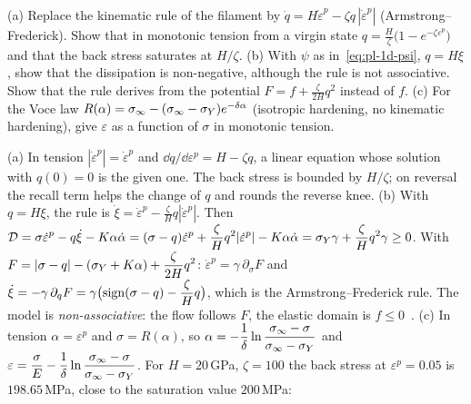 \label{exo:pl-af}
%
(a) Replace the kinematic rule of the filament by
$\dot q=H\dot\varepsilon^p-\zeta q\,|\dot\varepsilon^p|$ (Armstrong--Frederick).
Show that in monotonic tension from a virgin state
$\displaystyle q=\frac H\zeta\bigl(1-e^{-\zeta\varepsilon^p}\bigr)$ and that the back stress
saturates at $H/\zeta$. (b) With $\psi$ as in~\eqref{eq:pl-1d-psi}, $q=H\xi$,
show that the dissipation is non-negative, although the rule is not
associative. Show that the rule derives from the potential
$\displaystyle F=f+\frac{\zeta}{2H}q^2$ instead of $f$. (c) For the Voce law
$R(\alpha)=\sigma_\infty-(\sigma_\infty-\sigma_{Y})e^{-\delta\alpha}$ (isotropic
hardening, no kinematic hardening), give $\varepsilon$ as a function of
$\sigma$ in monotonic tension.
\begin{solution}
(a) In tension $|\dot\varepsilon^p|=\dot\varepsilon^p$ and
$\dd q/\dd\varepsilon^p=H-\zeta q$, a linear equation whose solution with
$q(0)=0$ is the given one. The back stress is bounded by $H/\zeta$; on
reversal the recall term helps the change of $q$ and rounds the reverse knee.
(b) With $q=H\xi$, the rule is $\displaystyle \dot\xi=\dot\varepsilon^p-\frac{\zeta}{H}q|\dot\varepsilon^p|$.
Then $\displaystyle \mathcal D=\sigma\dot\varepsilon^p-q\dot\xi-K\alpha\dot\alpha
=(\sigma-q)\dot\varepsilon^p+\frac\zeta Hq^2|\dot\varepsilon^p|-K\alpha\dot\alpha
=\sigma_{Y}\gamma+\frac\zeta Hq^2\gamma\ge0$. With $\displaystyle F=|\sigma-q|-(\sigma_{Y}+K\alpha)+\frac{\zeta}{2H}q^2$:
$\dot\varepsilon^p=\gamma\,\partial_\sigma F$ and
$\displaystyle \dot\xi=-\gamma\,\partial_qF=\gamma\bigl(\operatorname{sign}(\sigma-q)-\frac\zeta Hq\bigr)$, which is
the Armstrong--Frederick rule. The model is \emph{non-associative}: the flow
follows $F$, the elastic domain is $f\le0$~\cite{LemaitreChaboche1990}.
(c) In tension $\alpha=\varepsilon^p$ and $\sigma=R(\alpha)$, so
$\displaystyle \alpha=-\frac1\delta\ln\frac{\sigma_\infty-\sigma}{\sigma_\infty-\sigma_{Y}}$
and $\displaystyle \varepsilon=\frac\sigma E-\frac1\delta\ln\frac{\sigma_\infty-\sigma}{\sigma_\infty-\sigma_{Y}}$.
For $H=20$\,GPa, $\zeta=100$ the back stress at $\varepsilon^p=0.05$ is
$198.65$\,MPa, close to the saturation value $200$\,MPa:

\end{solution}

